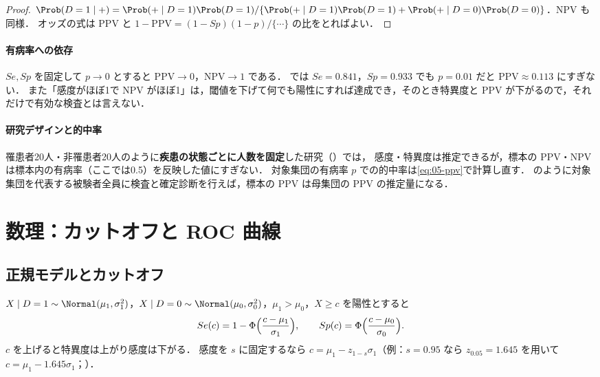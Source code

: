 \begin{proof}
$\Prob(D=1\mid+)=\Prob(+\mid D=1)\Prob(D=1)/\{\Prob(+\mid D=1)\Prob(D=1)+\Prob(+\mid D=0)\Prob(D=0)\}$．NPV も同様．
オッズの式は PPV と $1-\mathrm{PPV}=(1-Sp)(1-p)/\{\cdots\}$ の比をとればよい．
\end{proof}
\paragraph{有病率への依存}
$Se,Sp$ を固定して $p\to0$ とすると $\mathrm{PPV}\to0$，$\mathrm{NPV}\to1$ である．
 では $Se=0.841$，$Sp=0.933$ でも $p=0.01$ だと $\mathrm{PPV}\approx0.113$ にすぎない．
また「感度がほぼ1で NPV がほぼ1」は，閾値を下げて何でも陽性にすれば達成でき，そのとき特異度と PPV が下がるので，それだけで有効な検査とは言えない．

\paragraph{研究デザインと的中率}
\Youchui 罹患者20人・非罹患者20人のように\textbf{疾患の状態ごとに人数を固定}した研究（）では，
感度・特異度は推定できるが，標本の PPV・NPV は標本内の有病率（ここでは0.5）を反映した値にすぎない．
対象集団の有病率 $p$ での的中率は\cref{eq:05-ppv}で計算し直す．
 のように対象集団を代表する被験者全員に検査と確定診断を行えば，標本の PPV は母集団の PPV の推定量になる．

\section{数理：カットオフと ROC 曲線}\label{sec:05-roc}
\subsection{正規モデルとカットオフ}\label{subsec:05-binormal}
$X\mid D=1\sim\Normal(\mu_1,\sigma_1^2)$，$X\mid D=0\sim\Normal(\mu_0,\sigma_0^2)$，$\mu_1>\mu_0$，$X\ge c$ を陽性とすると
\[
Se(c)=1-\Phi\Bigl(\frac{c-\mu_1}{\sigma_1}\Bigr),\qquad Sp(c)=\Phi\Bigl(\frac{c-\mu_0}{\sigma_0}\Bigr).
\]
$c$ を上げると特異度は上がり感度は下がる．
感度を $s$ に固定するなら $c=\mu_1-z_{1-s}\sigma_1$（例：$s=0.95$ なら $z_{0.05}=1.645$ を用いて $c=\mu_1-1.645\sigma_1$；）．

